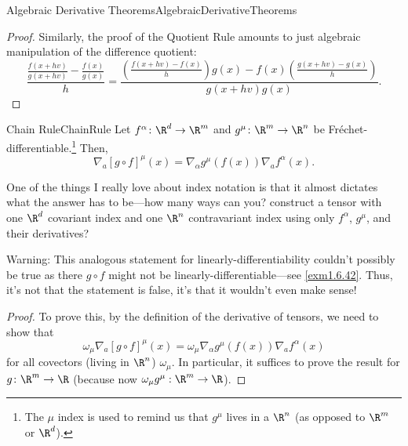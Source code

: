 \begin{prp}{Algebraic Derivative Theorems\hfill}{AlgebraicDerivativeTheorems}
\begin{proof}
Similarly, the proof of the Quotient Rule amounts to just algebraic manipulation of the difference quotient:
\begin{equation*}
\frac{\frac{f(x+hv)}{g(x+hv)}-\frac{f(x)}{g(x)}}{h}=\frac{\left( \frac{f(x+hv)-f(x)}{h}\right) g(x)-f(x)\left( \frac{g(x+hv)-g(x)}{h}\right)}{g(x+hv)g(x)}.
\end{equation*}
\end{proof}
\end{prp}
\begin{prp}{Chain Rule}{ChainRule}
Let $f^\alpha \colon \R ^d\rightarrow \R ^m$ and $g^\mu \colon \R ^m\rightarrow \R ^n$ be Fréchet-differentiable.\footnote{The $\mu$ index is used to remind us that $g^\mu$ lives in a $\R ^n$ (as opposed to $\R ^m$ or $\R ^d$).}  Then,
\begin{equation}
\nabla _a[g\circ f]^\mu (x)=\nabla _\alpha g^\mu (f(x))\nabla _af^\alpha (x).
\end{equation}
\begin{rmk}
One of the things I really love about index notation is that it almost dictates what the answer has to be---how many ways can you? construct a tensor with one $\R ^d$ covariant index and one $\R ^n$ contravariant index using only $f^\alpha$, $g^\mu$, and their derivatives?
\end{rmk}
\begin{wrn}
	Warning:  This analogous statement for linearly-differentiability couldn't possibly be true as there $g\circ f$ might not be linearly-differentiable---see \cref{exm1.6.42}.  Thus, it's not that the statement is false, it's that it wouldn't even make sense!
\end{wrn}
\begin{proof}
To prove this, by the definition of the derivative of tensors, we need to show that
\begin{equation}
\omega _\mu \nabla _a[g\circ f]^\mu (x)=\omega _\mu \nabla _\alpha g^\mu (f(x))\nabla _af^\alpha (x)
\end{equation}
for all covectors (living in $\R ^n$) $\omega _\mu$.  In particular, it suffices to prove the result for $g\colon \R ^m\rightarrow \R$ (because now $\omega _\mu g^\mu :\R ^m\rightarrow \R$).


\end{proof}
\end{prp}
